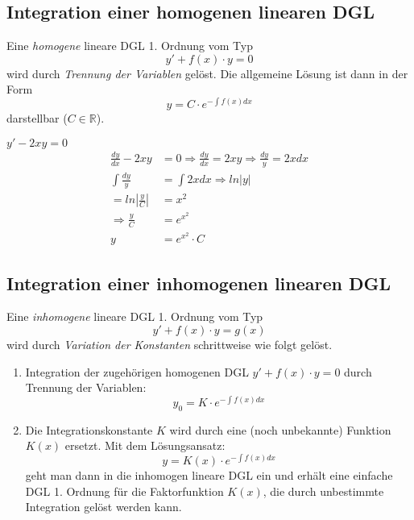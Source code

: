 \subsection{Integration einer homogenen linearen DGL}
Eine \textit{homogene} lineare DGL 1. Ordnung vom Typ
$$y' + f(x) \cdot y = 0$$
wird durch \textit{Trennung der Variablen} gelöst. Die allgemeine Lösung ist dann in der Form
$$y = C \cdot e^{ - \int f(x) dx}$$
darstellbar ($C \in \mathbb{R}$).
\begin{bsp}
$y' - 2xy = 0$
\begin{align*}
\frac{dy}{dx}-2xy &= 0 \Rightarrow \frac{dy}{dx}=2xy \Rightarrow \frac{dy}{y} = 2x dx \\
\int\frac{dy}{y}  &= \int 2x dx \Rightarrow ln|y| \\
= ln \left|\frac{y}{C}\right| &= x^2 \\
\Rightarrow \frac{y}{C} &= e^{x^2} \\
y &= e^{x^2} \cdot C 
\end{align*}
\end{bsp}

\subsection{Integration einer inhomogenen linearen DGL}
Eine \textit{inhomogene} lineare DGL 1. Ordnung vom Typ
$$y' + f(x) \cdot y = g(x)$$
wird durch \textit{Variation der Konstanten} schrittweise wie folgt gelöst. 
\begin{enumerate}
	\item Integration der zugehörigen homogenen DGL $y' + f(x) \cdot y = 0$ durch Trennung der Variablen:
	$$y_0 = K \cdot e^{- \int f(x) dx}$$
	\item Die Integrationskonstante $K$ wird durch eine (noch unbekannte) Funktion $K(x)$ ersetzt. Mit dem Lösungsansatz:
	$$y=K(x) \cdot e^{- \int f(x) dx}$$
	geht man dann in die inhomogen lineare DGL ein und erhält eine einfache DGL 1. Ordnung für die Faktorfunktion $K(x)$, die durch unbestimmte Integration gelöst werden kann.
\end{enumerate}

